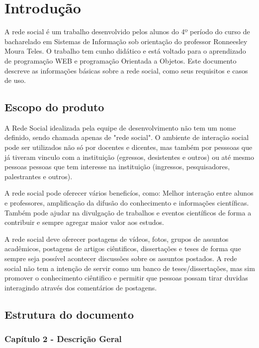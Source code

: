 \chapter{Introdução}

A rede social é um trabalho desenvolvido pelos alunos do 4º período do curso de bacharelado em Sistemas de Informação sob orientação do professor Ronneesley Moura Teles.
O trabalho tem cunho didático e está voltado para o aprendizado de programação WEB e programação Orientada a Objetos.
Este documento descreve as informações básicas sobre a rede social, como seus requisitos e casos de uso.


\section{Escopo do produto}
A Rede Social idealizada pela equipe de desenvolvimento não tem um nome definido, sendo chamada apenas de "rede social".
O ambiente de interação social pode ser utilizados não só por docentes e dicentes, mas também por pesssoas que já tiveram vinculo com a instituição (egressos, desistentes e outros) ou até mesmo
pessoas pessoas que tem interesse na instituição (ingressos, pesquisadores, palestrantes e outros).

A rede social pode oferecer vários beneficíos, como: Melhor interação entre alunos e professores, amplificação da difusão do conhecimento e informações científicas.
Também pode ajudar na divulgação de trabalhos e eventos científicos de forma a contribuir e sempre agregar maior valor aos estudos.

A rede social deve oferecer postagens de vídeos, fotos, grupos de assuntos acadêmicos, postagens de artigos ciêntificos, dissertações e teses de forma que sempre seja possível 
acontecer discussões sobre os assuntos postados. A rede social não tem a intenção de servir como um banco de teses/dissertações, mas sim promover o conhecimento ciêntifico e permitir
que pessoas possam tirar duvidas interagindo através dos comentários de postagens. 
  

\section{Estrutura do documento}

\subsection{Capítulo 2 - Descrição Geral}


